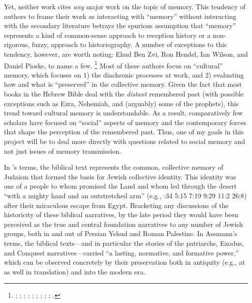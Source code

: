 Yet, neither work cites \emph{any} major work on the topic of memory. This tendency of authors to frame their work as interacting with ``memory'' without interacting with the secondary literature betrays the spurious assumption that ``memory'' represents a kind of common-sense approach to reception history or a non-rigorous, fuzzy, approach to historiography. A number of exceptions to this tendency, however, are worth noting: Ehud Ben Zvi, Ron Hendel, Ian Wilson, and Daniel Pioske, to name a few.%
    \footnote{%
        \Cite{benzvi_st2017};
        \cite{benzvi_bautch-knoppers2015};
        \cite{benzvi_edelman-benzvi2013};
        \cite{hendel2005};
        \cite{hendel_jbl2001};
        \cite{wilson2017};
        \cite{pioske2018};
        \cite{pioske_bibint2015};
        \cite{pioske2015};
        \cite{smith_cbq2002}.}
Most of these authors focus on ``cultural'' memory, which focuses on 1) the diachronic processes at work, and 2) evaluating how and what is ``preserved'' in the collective memory. Given the fact that most books in the Hebrew Bible deal with the \emph{distant} remembered past (with possible exceptions such as Ezra, Nehemiah, and (arguably) some of the prophets), this trend toward cultural memory is understandable. As a result, comparatively few scholars have focused on ``social'' aspects of memory and the contemporary forces that shape the perception of the remembered past. Thus, one of my goals in this project will be to deal more directly with questions related to social memory and not just issues of memory transmission.

In \halbwachs's terms, the biblical text represents the common, collective memory of \secondtemple Judaism that formed the basis for Jewish collective identity. This identity was one of a people to whom \yahweh promised the Land and whom \yahweh led through the desert ``with a mighty hand and an outstretched arm'' (e.g., :34 5:15 7:19 9:29 11:2 26:8) after their miraculous escape from Egypt. Bracketing any discussions of the historicity of these biblical narratives, by the late \secondtemple period they would have been perceived as the true and central foundation narratives to any number of Jewish groups, both in and out of Persian Yehud and Roman Palestine. In Assmann's terms, the biblical texts---and in particular the stories of the patriarchs, Exodus, and Conquest narratives---carried ``a lasting, normative, and formative power,''%
    \autocite[38]{assmann2011}
which can be observed concretely by their preservation both in antiquity (e.g., at \qumran as well in translation) and into the modern era.  


